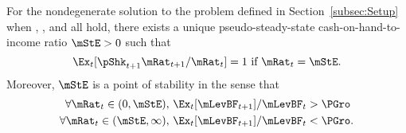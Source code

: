 \begin{theorem}\label{thm:MSSBalExists}
 For the nondegenerate solution to the problem defined in Section~\ref{subsec:Setup} when {\FVAC}, {\WRIC}, and {\GIC} all hold, there exists a unique pseudo-steady-state cash-on-hand-to-income ratio $\mStE>0$ such that
  \begin{equation}
    \Ex_t [\pShk_{t+1}{\mRat}_{t+1}/\mRat_t] = 1 \mbox{~if~} \mRat_t = \mStE.
    \label{eq:mStE}
  \end{equation}
  Moreover, $\mStE$ is a point of stability in the sense that
  \begin{align}\label{eq:stabilityStE}
    \forall {\mRat}_t\in(0,\mStE),      \,\,& \Ex_{t}[\mLevBF_{t+1}]/\mLevBF_{t} > \PGro \\
    \forall {\mRat}_t\in(\mStE,\infty), \,\,& \Ex_{t}[\mLevBF_{t+1}]/\mLevBF_{t} < \PGro. \notag
  \end{align}
\end{theorem}

